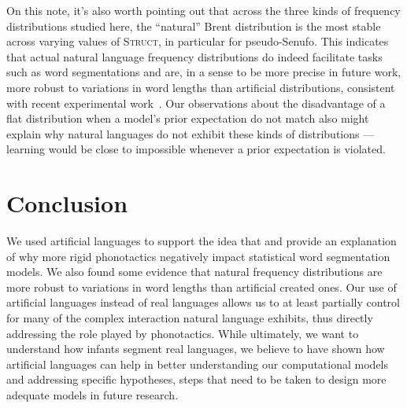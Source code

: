 \documentclass[11pt]{article}
\begin{document}
On this note, it's also worth pointing out that across the three kinds of frequency distributions studied here, the ``natural'' Brent distribution is the most stable across varying values of \textsc{Struct}, in particular for pseudo-Senufo. This indicates that actual natural language frequency distributions do indeed facilitate tasks such as word segmentations and are, in a sense to be more precise in future work, more robust to variations in word lengths than artificial distributions, consistent with recent experimental work~\cite{Kurumada13a}. Our observations about the disadvantage of a flat distribution when a model's prior expectation do not match also might explain why natural languages do not exhibit these kinds of distributions --- learning would be close to impossible whenever a prior expectation is violated.

\section{Conclusion}
\vspace*{-5pt}
We used artificial languages to support the idea that and provide an explanation of why more rigid phonotactics negatively impact statistical word segmentation models. We also found some evidence that natural frequency distributions are more robust to variations in word lengths than artificial created ones. Our use of artificial languages instead of real languages allows us to at least partially control for many of the complex interaction natural language exhibits, thus directly addressing the role played by phonotactics. While ultimately, we want to understand how infants segment real languages, we believe to have shown how artificial languages can help in better understanding our computational models and addressing specific hypotheses, steps that need to be taken to design more adequate models in future research.



\end{document}
